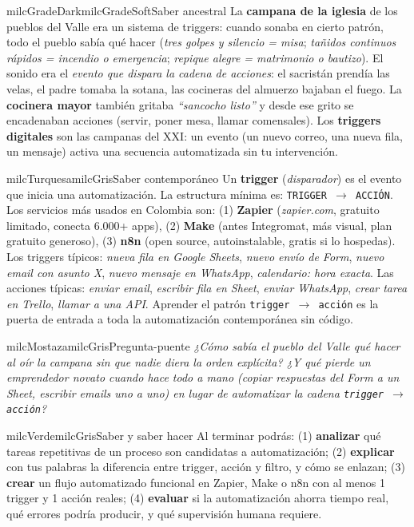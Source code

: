 \documentclass[11pt,letterpaper]{article}
\begin{document}
\begin{softbox}{milcGradeDark}{milcGradeSoft}{Saber ancestral}
La \textbf{campana de la iglesia} de los pueblos del Valle era un sistema de triggers: cuando sonaba en cierto patrón, todo el pueblo sabía qué hacer (\emph{tres golpes y silencio = misa}; \emph{tañidos continuos rápidos = incendio o emergencia}; \emph{repique alegre = matrimonio o bautizo}). El sonido era el \emph{evento que dispara la cadena de acciones}: el sacristán prendía las velas, el padre tomaba la sotana, las cocineras del almuerzo bajaban el fuego. La \textbf{cocinera mayor} también gritaba \emph{``sancocho listo''} y desde ese grito se encadenaban acciones (servir, poner mesa, llamar comensales). Los \textbf{triggers digitales} son las campanas del XXI: un evento (un nuevo correo, una nueva fila, un mensaje) activa una secuencia automatizada sin tu intervención.
\end{softbox}

\begin{softbox}{milcTurquesa}{milcGris}{Saber contemporáneo}
Un \textbf{trigger} (\emph{disparador}) es el evento que inicia una automatización. La estructura mínima es: \texttt{TRIGGER $\to$ ACCIÓN}. Los servicios más usados en Colombia son: (1) \textbf{Zapier} (\emph{zapier.com}, gratuito limitado, conecta 6.000+ apps), (2) \textbf{Make} (antes Integromat, más visual, plan gratuito generoso), (3) \textbf{n8n} (open source, autoinstalable, gratis si lo hospedas). Los triggers típicos: \emph{nueva fila en Google Sheets}, \emph{nuevo envío de Form}, \emph{nuevo email con asunto X}, \emph{nuevo mensaje en WhatsApp}, \emph{calendario: hora exacta}. Las acciones típicas: \emph{enviar email}, \emph{escribir fila en Sheet}, \emph{enviar WhatsApp}, \emph{crear tarea en Trello}, \emph{llamar a una API}. Aprender el patrón \texttt{trigger $\to$ acción} es la puerta de entrada a toda la automatización contemporánea sin código.
\end{softbox}

\begin{softbox}{milcMostaza}{milcGris}{Pregunta-puente}
\textit{¿Cómo sabía el pueblo del Valle qué hacer al oír la campana sin que nadie diera la orden explícita? ¿Y qué pierde un emprendedor novato cuando hace todo a mano (copiar respuestas del Form a un Sheet, escribir emails uno a uno) en lugar de automatizar la cadena \texttt{trigger $\to$ acción}?}
\end{softbox}

\begin{softbox}{milcVerde}{milcGris}{Saber y saber hacer}
Al terminar podrás: (1) \textbf{analizar} qué tareas repetitivas de un proceso son candidatas a automatización; (2) \textbf{explicar} con tus palabras la diferencia entre trigger, acción y filtro, y cómo se enlazan; (3) \textbf{crear} un flujo automatizado funcional en Zapier, Make o n8n con al menos 1 trigger y 1 acción reales; (4) \textbf{evaluar} si la automatización ahorra tiempo real, qué errores podría producir, y qué supervisión humana requiere.
\end{softbox}
\end{document}
